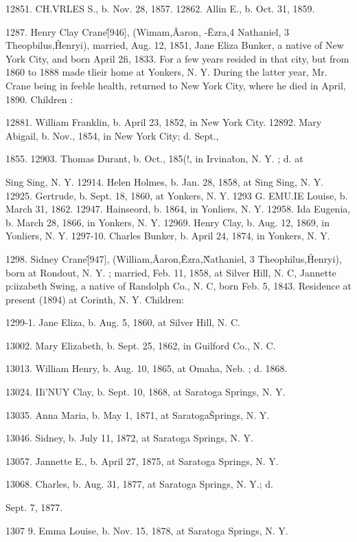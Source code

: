 12851. CH.VRLES S., b. Nov. 28, 1857. 
12862. Allin E., b. Oct. 31, 1859. 




1287. Henry Clay Crane\^ [946], (Wimam,\^ Aaron, -\^ Ezra,4 
Nathaniel, 3 Theopbilus,\^ Henryi), married, Aug. 12, 1851, Jane 
Eliza Bunker, a native of New York City, and born April 2fi, 
1833. For a few years resided in that city, but from 1860 to 
1888 made tlieir home at Yonkers, N. Y. During the latter year, 
Mr. Crane being in feeble health, returned to New York City, 
where he died in April, 1890. Children : 

12881. William Franklin, b. April 23, 1852, in New York City. 
12892. Mary Abigail, b. Nov., 1854, in New York City; d. Sept., 

1855. 
12903. Thomas Durant, b. Oct., 185(!, in Irvina\^ton, N. Y. ; d. at 

Sing Sing, N. Y. 
12914. Helen Holmes, b. Jan. 28, 1858, at Sing Sing, N. Y. 
12925. Gertrude, b. Sept. 18, 1860, at Yonkers, N. Y. 
1293 G. EMU.IE Louise, b. March 31, 1862. 
12947. Hainseord, b. 1864, in Yonliers, N. Y. 
12958. Ida Eugenia, b. March 28, 1866, in Yonkers, N. Y. 
12969. Henry Clay, b. Aug. 12, 1869, in Yonliers, N. Y. 
1297-10. Charles Bunker, b. April 24, 1874, in Yonkers, N. Y. 

1298. Sidney Crane\^ [947], (William,\^ Aaron,\^ Ezra,\^ 
Nathaniel, 3 Theophilus,\^ Henryi), born at Rondout, N. Y. ; 
married, Feb. 11, 1858, at Silver Hill, N. C, Jannette p:iizabeth 
Swing, a native of Randolph Co., N. C, born Feb. 5, 1843. 
Residence at present (1894) at Corinth, N. Y. Children: 

1299-1. Jane Eliza, b. Aug. 5, 1860, at Silver Hill, N. C. 

13002. Mary Elizabeth, b. Sept. 25, 1862, in Guilford Co., N. C. 

13013. William Henry, b. Aug. 10, 1865, at Omaha, Neb. ; d. 1868. 

13024. IIi'NUY Clay, b. Sept. 10, 1868, at Saratoga Springs, N. Y. 

13035. Anna Maria, b. May 1, 1871, at Saratoga\^Springs, N. Y. 

13046. Sidney, b. July 11, 1872, at Saratoga Springs, N. Y. 

13057. Jannette E., b. April 27, 1875, at Saratoga Springs, N. Y. 

13068. Charles, b. Aug. 31, 1877, at Saratoga Springs, N. Y.; d. 

Sept. 7, 1877. 

1307  9. Emma Louise, b. Nov. 15, 1878, at Saratoga Springs, N. Y. 

